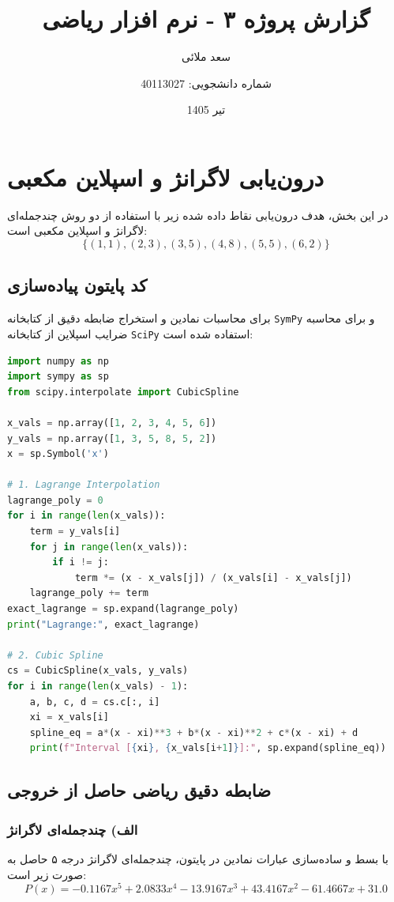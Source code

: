 \documentclass[a4paper,12pt]{article}
\title{\textbf{گزارش پروژه ۳ - نرم افزار ریاضی}}
\author{سعد ملائی \and شماره دانشجویی: 40113027}
\date{تیر 1405}
\begin{document}
\maketitle

\section{درون‌یابی لاگرانژ و اسپلاین مکعبی}
در این بخش، هدف درون‌یابی نقاط داده شده زیر با استفاده از دو روش چندجمله‌ای لاگرانژ و اسپلاین مکعبی است:
\[ \{(1,1), (2,3), (3,5), (4,8), (5,5), (6,2)\} \]

\subsection{کد پایتون پیاده‌سازی}
برای محاسبات نمادین و استخراج ضابطه دقیق از کتابخانه \texttt{SymPy} و برای محاسبه ضرایب اسپلاین از کتابخانه \texttt{SciPy} استفاده شده است:

\begin{latin}
\begin{lstlisting}[language=Python]
import numpy as np
import sympy as sp
from scipy.interpolate import CubicSpline

x_vals = np.array([1, 2, 3, 4, 5, 6])
y_vals = np.array([1, 3, 5, 8, 5, 2])
x = sp.Symbol('x')

# 1. Lagrange Interpolation
lagrange_poly = 0
for i in range(len(x_vals)):
    term = y_vals[i]
    for j in range(len(x_vals)):
        if i != j:
            term *= (x - x_vals[j]) / (x_vals[i] - x_vals[j])
    lagrange_poly += term
exact_lagrange = sp.expand(lagrange_poly)
print("Lagrange:", exact_lagrange)

# 2. Cubic Spline
cs = CubicSpline(x_vals, y_vals)
for i in range(len(x_vals) - 1):
    a, b, c, d = cs.c[:, i]
    xi = x_vals[i]
    spline_eq = a*(x - xi)**3 + b*(x - xi)**2 + c*(x - xi) + d
    print(f"Interval [{xi}, {x_vals[i+1]}]:", sp.expand(spline_eq))
\end{lstlisting}
\end{latin}

\subsection{ضابطه دقیق ریاضی حاصل از خروجی}

\subsubsection{الف) چندجمله‌ای لاگرانژ}
با بسط و ساده‌سازی عبارات نمادین در پایتون، چندجمله‌ای لاگرانژ درجه ۵ حاصل به صورت زیر است:
\[ P(x) = -0.1167x^5 + 2.0833x^4 - 13.9167x^3 + 43.4167x^2 - 61.4667x + 31.0 \]
\end{document}
